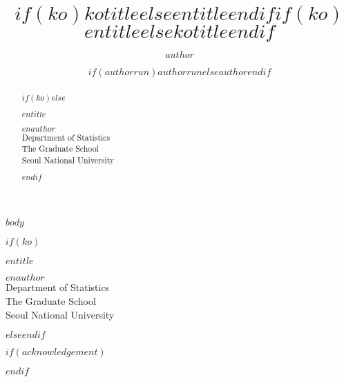 \documentclass[$if(twoside)$twoside,$else$oneside,$endif$$if(phd)$phd,$else$master,$endif$$if(ko)$ko,$endif$]{snuthesis}
\title{$if(ko)$$kotitle$$else$$entitle$$endif$}
\title*{$if(ko)$$entitle$$else$$kotitle$$endif$}
\author{$author$}
\author*{$if(authorrun)$$authorrun$$else$$author$$endif$} %
\begin{document}
\makefrontcover
\makefrontcover
\makeapproval

\cleardoublepage
{}

\begin{abstract}
$if(ko)$$else$
\begin{center}
\LARGE
\begin{spacing}{0.9}
\textbf{
$entitle$}
\end{spacing}
\end{center}
\begin{flushright}
\begin{spacing}{0.9}
\Large
$enauthor$ \\
Department of Statistics \\
The Graduate School \\
Seoul National University
\end{spacing}
\end{flushright}
$endif$
\noindent

\end{abstract}

\tableofcontents
\listoffigures
\listoftables

\cleardoublepage
{}

%
%

$body$







\begin{abstractalt}
$if(ko)$
\begin{center}
\LARGE
\begin{spacing}{0.9}
\textbf{
$entitle$}
\end{spacing}
\end{center}
\begin{flushright}
\begin{spacing}{0.9}
\Large
$enauthor$ \\
Department of Statistics \\
The Graduate School \\
Seoul National University
\end{spacing}
\end{flushright}
$else$$endif$

\end{abstractalt}

$if(acknowledgement)$
\acknowledgement

$endif$
\end{document}

